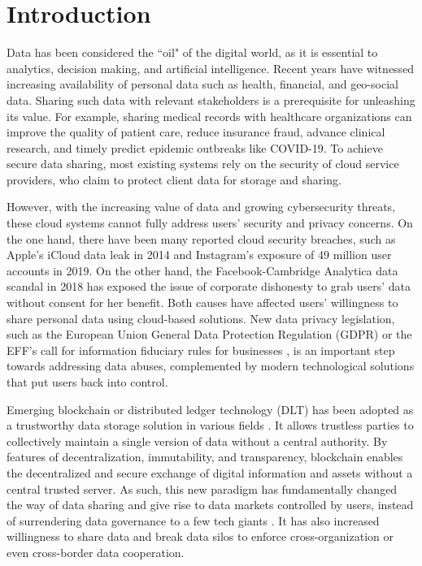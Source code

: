 \documentclass[11pt,divpdfm]{article}
\begin{document}
\section{Introduction}
Data has been considered the ``oil" of the digital world, as it is essential to analytics, decision making, and artificial intelligence.
Recent years have witnessed increasing availability of personal data such as health, financial, and geo-social data.
Sharing such data with relevant stakeholders is a prerequisite for unleashing its value.
For example, sharing medical records with healthcare organizations can improve the quality of patient care, reduce insurance fraud, advance clinical research, and timely predict epidemic outbreaks like COVID-19.
To achieve secure data sharing, most existing systems rely on the security of cloud service providers, who claim to protect client data for storage and sharing.

However, with the increasing value of data and growing cybersecurity threats, these cloud systems cannot fully address users' security and privacy concerns.
On the one hand, there have been many reported cloud security breaches, such as Apple's iCloud data leak in 2014 and Instagram's exposure of 49 million user accounts in 2019.
On the other hand, the Facebook-Cambridge Analytica data scandal in 2018 has exposed the issue of corporate dishonesty to grab users' data without consent for her benefit.
Both causes have affected users' willingness to share personal data using cloud-based solutions.
New data privacy legislation, such as the European Union General Data Protection Regulation (GDPR) \cite{gdpr} or the EFF's call for information fiduciary rules for businesses \cite{eff}, is an important step towards addressing data abuses, complemented by modern technological solutions that put users back into control.


Emerging blockchain or distributed ledger technology (DLT) has been adopted as a trustworthy data storage solution in various fields \cite{peng2021vfchain, peng2021p2b, wang2022vchain+}.
It allows trustless parties to collectively maintain a single version of data without a central authority.
By features of decentralization, immutability, and transparency, blockchain enables the decentralized and secure exchange of digital information and assets without a central trusted server.
As such, this new paradigm has fundamentally changed the way of data sharing and give rise to data markets controlled by users, instead of surrendering data governance to a few tech giants \cite{subramanian2017decentralized}.
It has also increased willingness to share data and break data silos to enforce cross-organization or even cross-border data cooperation.
\end{document}
